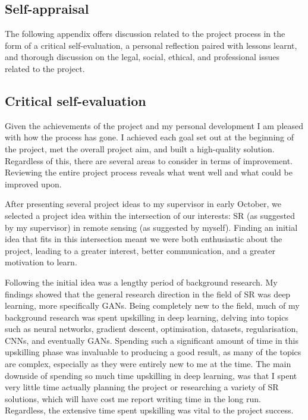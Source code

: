 \begin{appendices}
\chapter{Self-appraisal}
The following appendix offers discussion related to the project process in the form of a critical self-evaluation, a personal reflection paired with lessons learnt, and thorough discussion on the legal, social, ethical, and professional issues related to the project.

\section{Critical self-evaluation}
Given the achievements of the project and my personal development I am pleased with how the process has gone. I achieved each goal set out at the beginning of the project, met the overall project aim, and built a high-quality solution. Regardless of this, there are several areas to consider in terms of improvement. Reviewing the entire project process reveals what went well and what could be improved upon.

After presenting several project ideas to my supervisor in early October, we selected a project idea within the intersection of our interests: SR (as suggested by my supervisor) in remote sensing (as suggested by myself). Finding an initial idea that fits in this intersection meant we were both enthusiastic about the project, leading to a greater interest, better communication, and a greater motivation to learn. 

Following the initial idea was a lengthy period of background research. My findings showed that the general research direction in the field of SR was deep learning, more specifically GANs. Being completely new to the field, much of my background research was spent upskilling in deep learning, delving into topics such as neural networks, gradient descent, optimisation, datasets, regularisation, CNNs, and eventually GANs. Spending such a significant amount of time in this upskilling phase was invaluable to producing a good result, as many of the topics are complex, especially as they were entirely new to me at the time. The main downside of spending so much time upskilling in deep learning, was that I spent very little time actually planning the project or researching a variety of SR solutions, which will have cost me report writing time in the long run. Regardless, the extensive time spent upskilling was vital to the project success.


\end{appendices}
